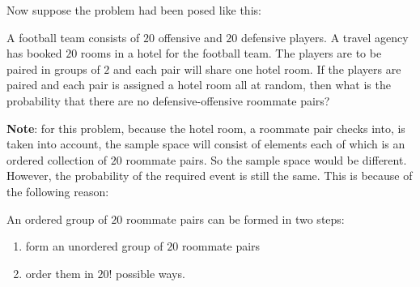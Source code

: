 Now suppose the problem had been posed like this:
\begin{example}
    A football team consists of $20$ offensive and $20$ defensive players. A
travel agency has booked $20$ rooms in a hotel for the football team. The
players are to be paired in groups of $2$ and each pair will share one hotel
room. If the players are paired and each pair is assigned a hotel room all at
random, then what is the probability that there are no defensive-offensive
roommate pairs?
\end{example}
\noindent \textbf{Note}: for this problem, because the hotel room, a roommate
pair checks into, is taken into account, the sample space will consist of
elements each of which is an ordered collection of $20$ roommate pairs. So the
sample space would be different. However, the probability of the required event
is still the same. This is because of the following reason:

An ordered group of $20$ roommate pairs can be formed in two steps:
\begin{enumerate}[noitemsep,topsep=0pt]
    \item form an unordered group of $20$ roommate pairs
    \item order them in $20!$ possible ways. 
\end{enumerate}

